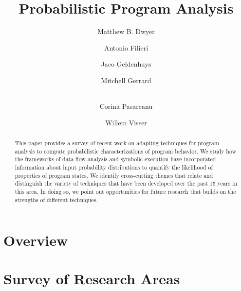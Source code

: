 \documentclass[runningheads,a4paper]{llncs}
\begin{document}
\mainmatter  %

\newcommand{\mycomment}[1]{\textit{\textcolor{red}{#1}}}
\newcommand{\ignore}[1]{}

\title{Probabilistic Program Analysis}


\author{Matthew B. Dwyer
\and Antonio Filieri\and Jaco Geldenhuys\and Mitchell Gerrard\and\\
Corina Pasareanu\and Willem Visser}
%


%
%

\maketitle


\begin{abstract}
This paper provides a survey of recent work on adapting 
techniques for program analysis to compute probabilistic
characterizations of program behavior.  We study how the
frameworks of data flow analysis and symbolic execution have
incorporated information about input probability distributions
to quantify the likelihood of properties of program states.
We identify cross-cutting themes that relate and distinguish
the variety of
techniques that have been developed over the past 15 years
in this area.  In doing so, we point out opportunities for
future research that builds on the strengths of different techniques.
\end{abstract}


\section{Overview}


\section{Survey of Research Areas}



%




\end{document}

